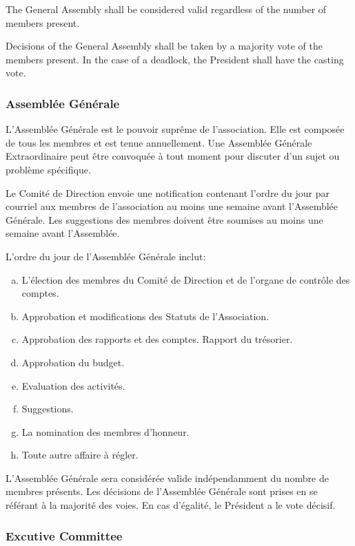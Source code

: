 \documentclass[12pt,a4paper,oneside]{article}
\newcounter{art}
\newcommand{\english}{    \switchcolumn[0]\noindent}
\newcommand{\french}{    \switchcolumn[1]\noindent}
\begin{document}
\begin{paracol}{2}
	The General Assembly shall be considered valid regardless of the number of members present.

	Decisions of the General Assembly shall be taken by a majority vote of the members present. In the case of a deadlock, the President shall have the casting vote.

	\french
	\subsubsection{Assemblée Générale}

	L'Assemblée Générale est le pouvoir suprême de l'association. Elle est composée de tous les membres et est tenue annuellement. Une Assemblée Générale Extraordinaire peut être convoquée à tout moment pour discuter d'un sujet ou problème spécifique.
 
	Le Comité de Direction envoie une notification contenant l’ordre du jour par courriel aux membres de l’association au moins une semaine avant l’Assemblée Générale. Les suggestions des membres doivent être soumises au moins une semaine avant l’Assemblée. 

	L’ordre du jour de l’Assemblée Générale inclut:
	\begin{enumerate}[(a)]
		\item L’élection des membres du Comité de Direction et de l’organe de contrôle des comptes.
		\item Approbation et modifications des Statuts de l’Association.
		\item Approbation des rapports et des comptes. Rapport du trésorier.
		\item Approbation du budget.
		\item Evaluation des activités.
		\item Suggestions.
		\item La nomination des membres d’honneur.
		\item Toute autre affaire à régler.
	\end{enumerate}

	L’Assemblée Générale sera considérée valide indépendamment du nombre de membres présents. Les décisions de l’Assemblée Générale sont prises en se référant à la majorité des voies. En cas d’égalité, le Président a le vote décisif.


	\english
	\subsubsection{Excutive Committee}


\end{paracol}
\end{document}
